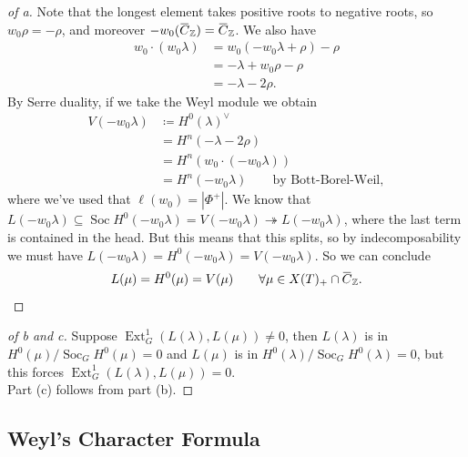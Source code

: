 \begin{proof}[of a]

Note that the longest element takes positive roots to negative roots, so
\(w_0 \rho = - \rho\), and moreover
\(-w_0(\mkern 1.5mu\overline{\mkern-1.5muC\mkern-1.5mu}\mkern 1.5mu_{\mathbb{Z}}) = \mkern 1.5mu\overline{\mkern-1.5muC\mkern-1.5mu}\mkern 1.5mu_{\mathbb{Z}}\).
We also have
\begin{align*}
w_0 \cdot ( w_0 \lambda) 
&= w_0 (-w_0 \lambda + \rho) - \rho \\
&= -\lambda + w_0 \rho - \rho \\
&= -\lambda - 2\rho
.\end{align*}
By Serre duality, if we take the Weyl module we obtain
\begin{align*}
V(-w_0 \lambda) 
&\coloneqq H^0(\lambda)^\vee\\
&= H^n(-\lambda - 2\rho) \\
&= H^n(w_0 \cdot (-w_0 \lambda)) \\
&= H^n(-w_0 \lambda) \qquad\text{by Bott-Borel-Weil}
,\end{align*}
where we've used that
\(\ell(w_0) = {\left\lvert {\Phi^+} \right\rvert}\). We know that
\(L(-w_0 \lambda) \subseteq \operatorname{Soc}H^0(-w_0 \lambda) = V(-w_0 \lambda) \twoheadrightarrow L(-w_0 \lambda)\),
where the last term is contained in the head. But this means that this
splits, so by indecomposability we must have
\(L(-w_0 \lambda) = H^0(-w_0 \lambda) = V(-w_0 \lambda)\). So we can
conclude
\begin{align*}  
L(\mu) = H^0(\mu) = V(\mu) \qquad \forall \mu \in X(T)_+ \cap\mkern 1.5mu\overline{\mkern-1.5muC\mkern-1.5mu}\mkern 1.5mu_{\mathbb{Z}}
.\end{align*}

\end{proof}

\begin{proof}[of b and c]

Suppose \(\operatorname{Ext}_G^1(L(\lambda), L(\mu)) \neq 0\), then
\(L(\lambda)\) is in \(H^0(\mu) / \operatorname{Soc}_G H^0(\mu) = 0\)
and \(L(\mu)\) is in
\(H^0(\lambda) / \operatorname{Soc}_G H^0(\lambda) = 0\), but this
forces \(\operatorname{Ext}_G^1(L(\lambda), L(\mu)) = 0\).\\

Part (c) follows from part (b).

\end{proof}

\hypertarget{weyls-character-formula}{%
\subsection{Weyl's Character Formula}\label{weyls-character-formula}}

